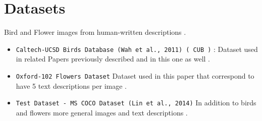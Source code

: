 
\section*{Datasets}
Bird and Flower images from human-written descriptions .

\begin{itemize}[noitemsep]
    \item \texttt{Caltech-UCSD Birds Database (Wah et al., 2011) ( CUB )} : 
    Dataset used in related Papers previously described and in this one as well .
    \item \texttt{Oxford-102 Flowers Dataset}
    Dataset used in this paper that correspond to have 5 text descriptions per image .
    \item \texttt{Test Dataset - MS COCO Dataset (Lin et al., 2014)}
    In addition to birds and flowers more general images and text descriptions .
\end{itemize}
